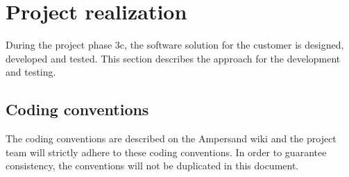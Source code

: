 \section{Project realization}
\label{sec:project-realization}
%
During the project phase 3c, the software solution for the customer is designed, developed and tested.
This section describes the approach for the development and testing.

\subsection{Coding conventions}
\label{subsec:coding-conventions}
%
The coding conventions are described on the Ampersand wiki \cite{ampersand-wiki} and the project team will strictly adhere to these coding conventions.
In order to guarantee consistency, the conventions will not be duplicated in this document.

